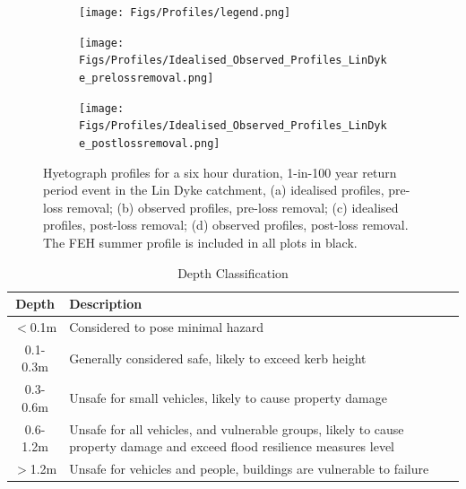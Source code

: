 \documentclass[APA,Times2COL]{WileyNJDv5}
\begin{document}
\begin{figure}[!t] 
\begin{subfigure}[H]{\linewidth}
\flushright
\texttt{[image: Figs/Profiles/legend.png]}
\end{subfigure}
\begin{subfigure}[H]{\linewidth}
\texttt{[image: Figs/Profiles/Idealised\_Observed\_Profiles\_LinDyke\_prelossremoval.png]}
\end{subfigure}
\begin{subfigure}{\linewidth}
   \centering
   \texttt{[image: Figs/Profiles/Idealised\_Observed\_Profiles\_LinDyke\_postlossremoval.png]}
\end{subfigure}
\caption{Hyetograph profiles for a six hour duration, 1-in-100 year return period event in the Lin Dyke catchment, (a) idealised profiles, pre-loss removal; (b) observed profiles, pre-loss removal; (c) idealised profiles, post-loss removal; (d) observed profiles, post-loss removal. The FEH summer profile is included in all plots in black.} \label{fig:profiles} 
\end{figure}

\begingroup
\setlength{\tabcolsep}{10pt} %
\renewcommand{\arraystretch}{1.5} %
\begin{table}[h!]
\centering
\caption{Depth Classification \citep{environment2019risk}}
\begin{tabular}{c C{13cm}} 
 \hline
 \textbf{Depth} & \textbf{Description} \\ [0.5ex] 
  \hline
 $<$0.1m & Considered to pose minimal hazard \\
 0.1-0.3m & Generally considered safe, likely to exceed kerb height \\
 0.3-0.6m & Unsafe for small vehicles, likely to cause property damage \\
 0.6-1.2m & Unsafe for all vehicles, and vulnerable groups, likely to cause property damage and exceed flood resilience measures level\\
 $>$1.2m & Unsafe for vehicles and people, buildings are vulnerable to failure \\
 [1ex] 
 \hline
\end{tabular}
\label{table:depth_cats}
\end{table}
\end{document}
